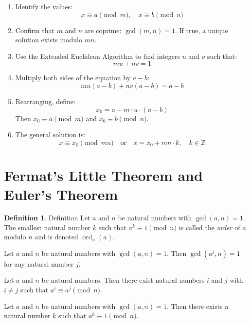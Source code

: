 \documentclass{article}
\theoremstyle{definition}
\newtheorem*{definition*}{Definition}
\newenvironment{manualtheorem}[1]{%
  \renewcommand{\thetheorem}{#1}%
  \theorem%
}{%
  \endtheorem%
}
\begin{document}
\begin{enumerate}
  \item Identify the values:
    \[
    x \equiv a \pmod{m}, \quad x \equiv b \pmod{n}
    \]

  \item Confirm that \( m \) and \( n \) are coprime: \( \gcd(m, n) = 1 \). If true, a unique solution exists modulo \( mn \).

  \item Use the Extended Euclidean Algorithm to find integers \( u \) and \( v \) such that:
    \[
    mu + nv = 1
    \]

  \item Multiply both sides of the equation by \( a - b \):
    \[
    m u (a - b) + n v (a - b) = a - b
    \]

  \item Rearranging, define:
    \[
    x_0 = a - m \cdot u \cdot (a - b)
    \]
    Then \( x_0 \equiv a \pmod{m} \) and \( x_0 \equiv b \pmod{n} \).

  \item The general solution is:
    \[
    x \equiv x_0 \pmod{mn}
    \quad \text{or} \quad
    x = x_0 + mn \cdot k, \quad k \in \mathbb{Z}
    \]
\end{enumerate}

\section{Fermat’s Little Theorem and Euler’s Theorem}

\begin{definition*}{Definition}
	Let $a$ and $n$ be natural numbers with $\gcd(a,n) = 1$. The smallest natural number $k$ such that $a^{k} \equiv 1 \pmod{n}$ is called the \emph{order} of $a$ modulo $n$ and is denoted $\operatorname{ord}_{n}(a)$.
\end{definition*}

\begin{manualtheorem}{4.2}
	Let $a$ and $n$ be natural numbers with $\gcd(a,n) = 1$. Then $\gcd(a^{j}, n) = 1$ for any natural number $j$.
\end{manualtheorem}

\begin{manualtheorem}{4.4}
	Let $a$ and $n$ be natural numbers. Then there exist natural numbers $i$ and $j$ with $i \ne j$ such that $a^{i} \equiv a^{j} \pmod{n}$.
\end{manualtheorem}

\begin{manualtheorem}{4.6}
	Let $a$ and $n$ be natural numbers with $\gcd(a,n) = 1$. Then there exists a natural number $k$ such that $a^{k} \equiv 1 \pmod{n}$.
\end{manualtheorem}
\end{document}
